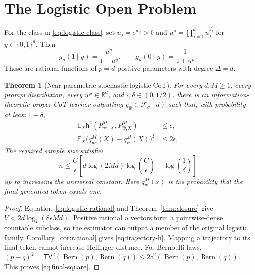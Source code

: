 \documentclass[twoside]{article}
\newtheorem{theorem}{Theorem}
\newcommand{\E}{\mathbb E}
\newcommand{\R}{\mathbb R}
\newcommand{\h}{\mathsf h}
\newcommand{\TV}{\mathsf{TV}}
\begin{document}
\section{The Logistic Open Problem}
\label{sec:logistic}

For the class in \eqref{eq:logistic-class}, set $u_j=e^{w_j}>0$ and $u^y=\prod_{j=1}^d u_j^{y_j}$ for $y\in\{0,1\}^d$. Then
\begin{equation}
 g_u(1\mid y)=\frac{u^y}{1+u^y},
 \qquad
 g_u(0\mid y)=\frac1{1+u^y}.
 \label{eq:logistic-rational}
\end{equation}
These are rational functions of $p=d$ positive parameters with degree $\Delta=d$.

\begin{theorem}[Near-parametric stochastic logistic CoT]
\label{thm:logistic}
For every $d,M\geq1$, every prompt distribution, every $w^\star\in\R^d$, and $\epsilon,\delta\in(0,1/2)$, there is an information-theoretic proper CoT learner outputting $g_{\widehat w}\in\mathcal F_\sigma(d)$ such that, with probability at least $1-\delta$,
\begin{align}
 \E_X\h^2(P^M_{w^\star,X},P^M_{\widehat w,X})&\leq\epsilon,
 \label{eq:trajectory-h}\\
 \E_X\bigl(q^M_{w^\star}(X)-q^M_{\widehat w}(X)\bigr)^2&\leq2\epsilon,
 \label{eq:final-square}
\end{align}
The required sample size satisfies
\begin{equation}
 n\leq \frac{C}{\epsilon}\left[d\log(2Md)\log\!\left(\frac C\epsilon\right)+\log\!\left(\frac1\delta\right)\right]
 \label{eq:logistic-rate}
\end{equation}
up to increasing the universal constant. Here $q^M_w(x)$ is the probability that the final generated token equals one.
\end{theorem}

\begin{proof}
Equation~\eqref{eq:logistic-rational} and Theorem~\ref{thm:closure} give $V<2d\log_2(8eMd)$. Positive rational $u$ vectors form a pointwise-dense countable subclass, so the estimator can output a member of the original logistic family. Corollary~\ref{cor:rational} gives \eqref{eq:trajectory-h}. Mapping a trajectory to its final token cannot increase Hellinger distance. For Bernoulli laws, $(p-q)^2=\TV^2(\operatorname{Bern}(p),\operatorname{Bern}(q))\leq2\h^2(\operatorname{Bern}(p),\operatorname{Bern}(q))$. This proves \eqref{eq:final-square}.
\end{proof}
\end{document}

